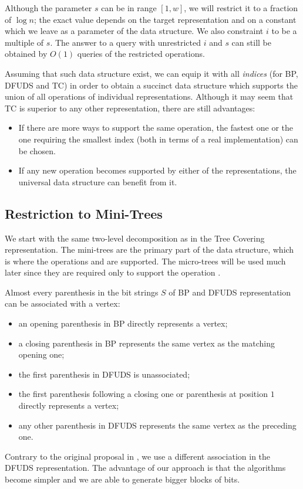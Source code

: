 Although the parameter $s$ can be in range $[1, w]$, we will restrict it to a fraction of $\log n$; the exact value depends on the target representation and on a constant which we leave as a parameter of the data structure.
We also constraint $i$ to be a multiple of $s$.
The answer to a query with unrestricted $i$ and $s$ can still be obtained by $O(1)$ queries of the restricted operations.

\bigbreak

Assuming that such data structure exist, we can equip it with all \emph{indices} (for BP, DFUDS and TC) in order to obtain a succinct data structure which supports the union of all operations of individual representations.
Although it may seem that TC is superior to any other representation, there are still advantages:
\begin{itemize}
	\item If there are more ways to support the same operation, the fastest one or the one requiring the smallest index (both in terms of a real implementation) can be chosen.
	\item If any new operation becomes supported by either of the representations, the universal data structure can benefit from it.
\end{itemize}

\subsection{Restriction to Mini-Trees}

We start with the same two-level decomposition as in the Tree Covering representation.
The mini-trees are the primary part of the data structure, which is where the operations \bpSubstring and \dfudsSubstring are supported.
The micro-trees will be used much later since they are required only to support the operation \tcMicrotree{}.

Almost every parenthesis in the bit strings $S$ of BP and DFUDS representation can be associated with a vertex:
\begin{itemize}
	\item an opening parenthesis in BP directly represents a vertex;
	\item a closing parenthesis in BP represents the same vertex as the matching opening one;
	\item the first parenthesis in DFUDS is unassociated;
	\item the first parenthesis following a closing one or parenthesis at position $1$ directly represents a vertex;
	\item any other parenthesis in DFUDS represents the same vertex as the preceding one.
\end{itemize}
Contrary to the original proposal in \cite{farzan2009universal}, we use a different association in the DFUDS representation.
The advantage of our approach is that the algorithms become simpler and we are able to generate bigger blocks of bits.

